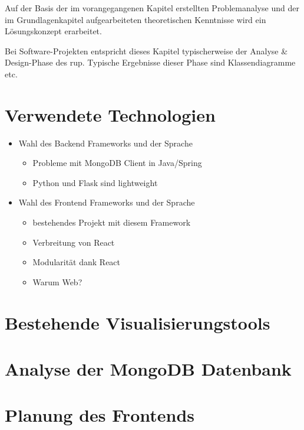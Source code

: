 Auf der Basis der im vorangegangenen Kapitel erstellten Problemanalyse 
und der im Grundlagenkapitel aufgearbeiteten theoretischen Kenntnisse 
wird ein Lösungskonzept erarbeitet.

Bei Software-Projekten entspricht dieses Kapitel typischerweise der 
Analyse \& Design-Phase des \ac{rup}. Typische Ergebnisse dieser Phase sind 
Klassendiagramme etc.

\section{Verwendete Technologien}
\label{sec:verwendete_technologien}

\begin{itemize}
    \item Wahl des Backend Frameworks  und der Sprache
    \begin{itemize}
        \item Probleme mit MongoDB Client in Java/Spring
        \item Python und Flask sind lightweight
    \end{itemize}
    \item Wahl des Frontend Frameworks und der Sprache
    \begin{itemize}
        \item bestehendes Projekt mit diesem Framework
        \item Verbreitung von React
        \item Modularität dank React
        \item Warum Web?
    \end{itemize}
\end{itemize}

\section{Bestehende Visualisierungstools}
\label{sec:bestehende_visualisierungstools}

\section{Analyse der MongoDB Datenbank}
\label{sec:mongoDB_analyse}

\section{Planung des Frontends}
\label{sec:planung_frontend}
